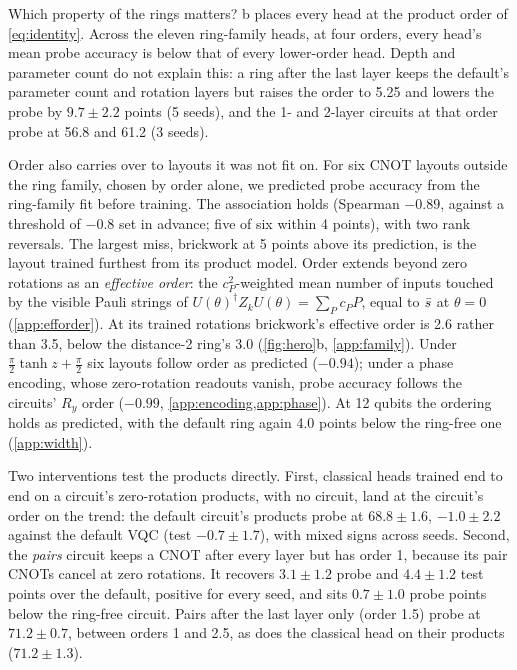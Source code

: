 Which property of the rings matters? b places every head at the product order
of \cref{eq:identity}. Across the eleven ring-family heads, at four orders, every head's mean
probe accuracy is below that of every lower-order head. Depth and parameter count do not explain
this: a ring after the last layer keeps the default's parameter count and rotation layers but
raises the order to 5.25 and lowers the probe by $9.7\pm2.2$ points (5 seeds), and the 1- and
2-layer circuits at that order probe at 56.8 and 61.2 (3 seeds).

Order also carries over to layouts it was not fit on. For six CNOT layouts outside the ring
family, chosen by order alone, we predicted probe accuracy from the ring-family fit before
training. The association holds (Spearman $-0.89$, against a threshold of $-0.8$ set in advance;
five of six within 4 points), with two rank reversals. The largest miss, brickwork at 5 points
above its prediction, is the layout trained furthest from its product model. Order extends beyond zero rotations as an \emph{effective order}: the $c_P^2$-weighted mean number of inputs touched by the visible Pauli strings of $U(\theta)^\dagger Z_kU(\theta)=\sum_Pc_PP$, equal to $\bar{s}$ at $\theta=0$ (\cref{app:efforder}). At its trained rotations
brickwork's effective order is 2.6 rather than 3.5, below the distance-2 ring's 3.0 (\cref{fig:hero}b,
\cref{app:family}). Under $\tfrac{\pi}{2}\tanh z+\tfrac{\pi}{2}$ six layouts follow order
as predicted ($-0.94$); under a phase encoding, whose zero-rotation readouts vanish, probe accuracy
follows the circuits' $R_y$ order ($-0.99$, \cref{app:encoding,app:phase}). At 12 qubits the
ordering holds as predicted, with the default ring again 4.0 points below the ring-free one
(\cref{app:width}).

Two interventions test the products directly. First, classical heads trained end to end on a
circuit's zero-rotation products, with no circuit, land at the circuit's order on the trend:
the default circuit's products probe at $68.8\pm1.6$, $-1.0\pm2.2$ against the default VQC (test $-0.7\pm1.7$), with mixed signs across seeds. Second, the
\emph{pairs} circuit keeps a CNOT after every layer but has order 1, because its pair CNOTs
cancel at zero rotations. It recovers $3.1\pm1.2$ probe and $4.4\pm1.2$ test points over the
default, positive for every seed, and sits $0.7\pm1.0$ probe points below the ring-free
circuit. Pairs after the
last layer only (order 1.5) probe at $71.2\pm0.7$, between orders 1 and 2.5, as does the
classical head on their products ($71.2\pm1.3$).

